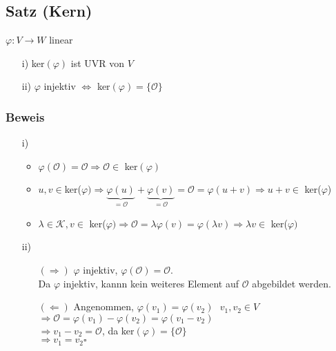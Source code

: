 \documentclass[a4paper, 12pt,titlepage, pdf, headsepline]{scrartcl}
\newcommand{\K}{\mathcal{K}}
\newcommand{\qed}{\hfill$\square$}
\renewcommand{\>}{\rightarrow}
\renewcommand{\*}{\cdot}
\renewcommand{\O}{\mathcal{O}}
\renewcommand{\phi}{\varphi}
\begin{document}
		      			\subsection{Satz (Kern)}
		      			\label{6.9}
		      			$\phi: V \rightarrow W$ linear
		      			\begin{itemize}
		      				\item[i)] ker$(\phi)$ ist UVR von $V$
		      				\item[ii)] $\phi$ injektiv $\Leftrightarrow$ ker$(\phi) = \{\O\}$
		      			\end{itemize}
		      			\subsubsection*{Beweis}
		      			\begin{itemize}
		      				\item[i)]
		      				      \begin{itemize}
		      				      	\item $\phi(\O) = \mathcal{O} \Rightarrow \mathcal{O} \in$ ker$(\phi)$
		      				      	\item $u,v \in $ker($\phi) \Rightarrow \underbrace{\phi(u)}_{= \O} + \underbrace{\phi(v)}_{=\O} = \O = \phi(u+v) \Rightarrow u+v \in $ ker($\phi$)
		      				      	\item $\lambda \in \K, v \in $ ker($\phi) \Rightarrow \O = \lambda \phi(v) = \phi(\lambda v) \Rightarrow \lambda v \in $ ker($\phi)$
		      				      \end{itemize}
		      				\item[ii)]
		      				      \begin{itemize}
		      				      	\item[$(\Rightarrow)$] $\phi$ injektiv, $\phi(\O) = \O$.\\ Da $\phi$ injektiv, kannn kein weiteres Element auf $\O$ abgebildet werden.
		      				      	\item[$(\Leftarrow)$] Angenommen, $\phi(v_1) = \phi(v_2)~~~ v_1, v_2 \in V$ \\
		      				      	      $\Rightarrow \O = \phi(v_1) - \phi(v_2) = \phi(v_1 - v_2)$ \\
		      				      	      $\Rightarrow v_1  - v_2 = \O$, da ker$(\phi) = \{\O\}$\\
		      				      	      $\Rightarrow v_1 = v_2 $\qed
		      				      \end{itemize}
		      			\end{itemize}
\end{document}
